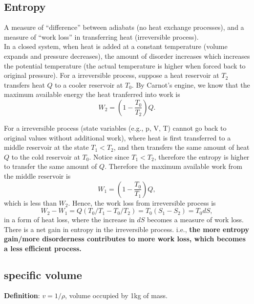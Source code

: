 \subsection{Entropy}
A measure of ``difference'' between adiabats (no heat exchange processes), and a measure of ``work loss'' in transferring heat (irreversible process). \\

In a closed system, when heat is added at a constant temperature (volume expands and pressure decreases),
the amount of disorder increases which increases the potential temperature (the actual temperature is higher when forced back to original pressure).
For a irreversible process, suppose a heat reservoir at $T_2$ transfers heat $Q$ to a cooler reservoir at $T_0$.
By Carnot's engine, we know that the maximum available energy the heat tranferred into work is
\begin{equation}
    W_2 = (1-\frac{T_0}{T_2})Q.
\end{equation}

For a irreversible process (state variables (e.g., p, V, T) cannot go back to original values without additional work), 
where heat is first transferred to a middle reservoir at the state $T_1 < T_2$, 
and then transfers the same amount of heat $Q$ to the cold reservoir at $T_0$.
Notice since $T_1 < T_2$, therefore the entropy is higher to transfer the same amount of $Q$.
Therefore the maximum available work from the middle reservoir is
\begin{equation}
    W_1 = (1-\frac{T_0}{T_1})Q,
\end{equation}
which is less than $W_2$.
Hence, the work loss from irreversible process is 
\begin{equation}
    W_2-W_1 = Q(T_0/T_1 - T_0/T_2) = T_0(S_1 - S_2) = T_0 dS,
\end{equation} 
in a form of heat loss, where the increase in $dS$ becomes a measure of work loss. 
There is a net gain in entropy in the irreversible process.
i.e., {\bf the more entropy gain/more disorderness contributes to more work loss, which becomes a less efficient process.}

\subsection{specific volume}
{\bf Definition}: $v = 1/\rho$, volume occupied by 1kg of mass.

